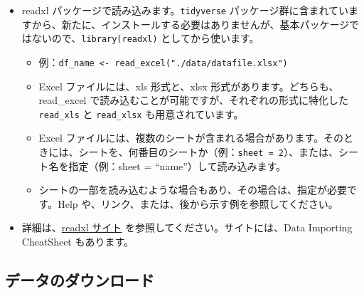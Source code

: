 \documentclass[
  xelatex, ja=standard]{bxjsbook}
\theoremstyle{definition}
\theoremstyle{definition}
\theoremstyle{definition}
\theoremstyle{definition}
\theoremstyle{remark}
\begin{document}
\begin{itemize}
\item
  readxl パッケージで読み込みます。\texttt{tidyverse} パッケージ群に含まれていますから、新たに、インストールする必要はありませんが、基本パッケージではないので、\texttt{library(readxl)} としてから使います。

  \begin{itemize}
  \item
    例：\texttt{df\_name\ \textless{}-\ read\_excel("./data/datafile.xlsx")}
  \item
    Excel ファイルには、xls 形式と、xlsx 形式があります。どちらも、read\_excel で読み込むことが可能ですが、それぞれの形式に特化した \texttt{read\_xls} と \texttt{read\_xlsx} も用意されています。
  \item
    Excel ファイルには、複数のシートが含まれる場合があります。そのときには、シートを、何番目のシートか（例：\texttt{sheet\ =\ 2}）、または、シート名を指定（例：sheet = ``name''）して読み込みます。
  \item
    シートの一部を読み込むような場合もあり、その場合は、指定が必要です。Help や、リンク、または、後から示す例を参照してください。
  \end{itemize}
\item
  詳細は、\href{https://readxl.tidyverse.org}{readxl サイト} を参照してください。サイトには、Data Importing CheatSheet もあります。
\end{itemize}

\hypertarget{ux30c7ux30fcux30bfux306eux30c0ux30a6ux30f3ux30edux30fcux30c9}{%
\subsection{データのダウンロード}\label{ux30c7ux30fcux30bfux306eux30c0ux30a6ux30f3ux30edux30fcux30c9}}
\end{document}
